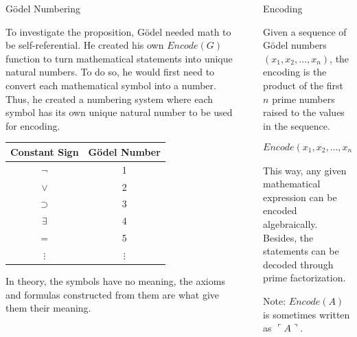 \documentclass[final]{beamer} %
\newlength{\sepwidth}
\newlength{\colwidth}
\newcommand{\separatorcolumn}{\begin{column}{\sepwidth}\end{column}}
\begin{document}
\begin{frame}[t]
\begin{columns}[t]
\begin{column}{\colwidth}
\begin{block}{Gödel Numbering}

      To investigate the proposition, Gödel needed math to be self-referential. He created his own $Encode(G)$ function to turn mathematical statements into unique natural numbers. To do so, he would first need to convert each mathematical symbol into a number. Thus, he created a numbering system where each symbol has its own unique natural number to be used for encoding.

    \begin{table}[h]
    \centering
    \begin{tabular}{c|c}
    \textbf{Constant Sign} & \textbf{Gödel Number} \\ \hline
    $\neg$ & 1 \\ 
    $\lor$ & 2 \\ 
    $\supset$ & 3 \\ 
    $\exists$ & 4 \\ 
    $=$ & 5 \\ 
    $\vdots$ & $\vdots$ \\ 
    \end{tabular}
    \end{table}

    In theory, the symbols have no meaning, the axioms and formulas constructed from them are what give them their meaning.
    
  \end{block}

\end{column}

\separatorcolumn %

\begin{column}{\colwidth}

  \begin{block}{Encoding}

    Given a sequence of Gödel numbers $(x_1, x_2, \dots, x_n)$, the encoding is the product of the first $n$ prime numbers raised to the values in the sequence.

    $$Encode(x_1, x_2, \dots, x_n) = 2^{x_1} \times 3^{x_2} \times \ldots \times p_n^{x_n}$$

    This way, any given mathematical expression can be encoded algebraically. Besides, the statements can be decoded through prime factorization.

    Note: $Encode(A)$ is sometimes written as $\ulcorner A \urcorner$.

  \end{block}


\end{column}
\end{columns}
\end{frame}
\end{document}
